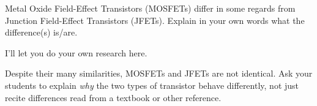 

Metal Oxide Field-Effect Transistors (MOSFETs) differ in some regards from Junction Field-Effect Transistors (JFETs).  Explain in your own words what the difference(s) is/are.







I'll let you do your own research here.







Despite their many similarities, MOSFETs and JFETs are not identical.  Ask your students to explain {\it why} the two types of transistor behave differently, not just recite differences read from a textbook or other reference.




